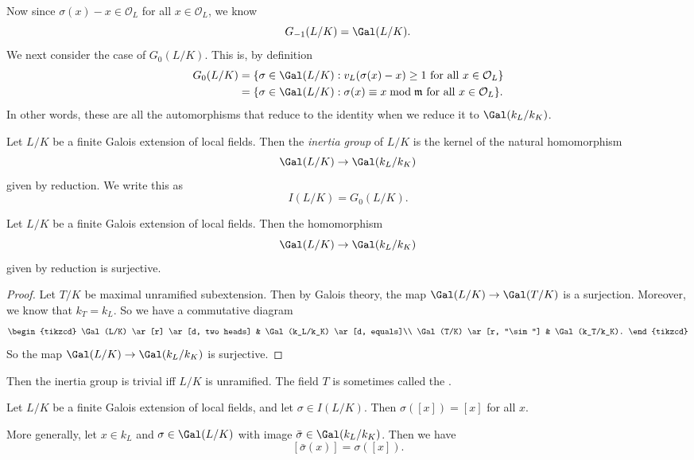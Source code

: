 \documentclass[a4paper]{article}
\begin{document}
Now since $\sigma(x) - x \in \mathcal{O}_L$ for all $x \in \mathcal{O}_L$, we know
\[
  G_{-1}(L/K) = \Gal(L/K).
\]
We next consider the case of $G_0(L/K)$. This is, by definition
\begin{align*}
  G_0(L/K) &= \{\sigma \in \Gal(L/K): v_L(\sigma(x) - x) \geq 1\text{ for all }x \in \mathcal{O}_L\}\\
  &= \{\sigma \in \Gal(L/K): \sigma(x) \equiv x \bmod \mathfrak{m}\text{ for all }x \in \mathcal{O}_L\}.
\end{align*}
In other words, these are all the automorphisms that reduce to the identity when we reduce it to $\Gal(k_L/k_K)$.

\begin{defi}
  Let $L/K$ be a finite Galois extension of local fields. Then the \emph{inertia group} of $L/K$ is the kernel of the natural homomorphism
  \[
    \Gal(L/K) \to \Gal(k_L/k_K)
  \]
  given by reduction. We write this as
  \[
    I(L/K) = G_0(L/K).
  \]
\end{defi}

\begin{prop}
  Let $L/K$ be a finite Galois extension of local fields. Then the homomorphism
  \[
    \Gal(L/K) \to \Gal(k_L/k_K)
  \]
  given by reduction is surjective.
\end{prop}

\begin{proof}
  Let $T/K$ be maximal unramified subextension. Then by Galois theory, the map $\Gal(L/K) \to \Gal(T/K)$ is a surjection. Moreover, we know that $k_T = k_L$. So we have a commutative diagram
  \[
    \begin{tikzcd}
      \Gal(L/K) \ar[r] \ar[d, two heads] & \Gal(k_L/k_K) \ar[d, equals]\\
      \Gal(T/K) \ar[r, "\sim"] & \Gal(k_T/k_K).
    \end{tikzcd}
  \]
  So the map $\Gal(L/K) \to \Gal(k_L/k_K)$ is surjective.
\end{proof}

Then the inertia group is trivial iff $L/K$ is unramified. The field $T$ is sometimes called the .

\begin{lemma}
  Let $L/K$ be a finite Galois extension of local fields, and let $\sigma \in I(L/K)$. Then $\sigma([x]) = [x]$ for all $x$.

  More generally, let $x \in k_L$ and $\sigma \in \Gal(L/K)$ with image $\bar{\sigma} \in \Gal(k_L/k_K)$. Then we have
  \[
    [\bar{\sigma}(x)] = \sigma([x]).
  \]
\end{lemma}
\end{document}

